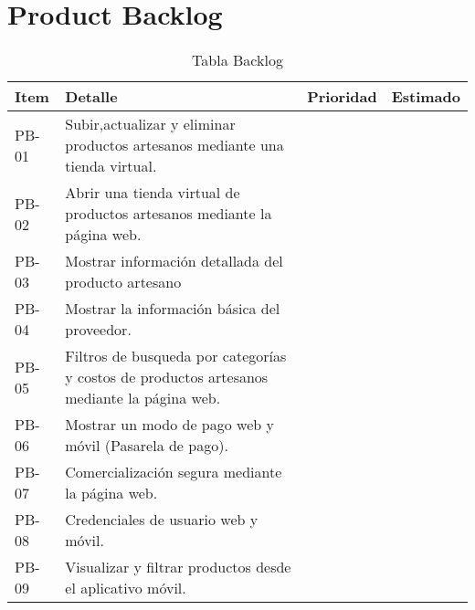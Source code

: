 \chapter{Product Backlog}


\begin{table}[htbp]
	\begin{center}
		\begin{tabular}{|p{2.5cm}|p{6.5cm}|p{2.5cm}|p{2.5cm}|}
			\hline
			Item & Detalle & Prioridad & Estimado\\
			\hline \hline
			PB-01 & Subir,actualizar y eliminar  productos artesanos mediante una tienda virtual. &  & \\ \hline
		    PB-02 & Abrir una tienda virtual de productos artesanos mediante la página web. &   & \\ \hline
			PB-03 & Mostrar información detallada del producto artesano &  & \\ \hline
			PB-04 & Mostrar la información básica del proveedor. &  & \\ \hline
			PB-05 & Filtros de busqueda por categorías y costos de productos artesanos mediante la página web. &  & \\ \hline
			PB-06 & Mostrar un modo de pago web y móvil (Pasarela de pago). &  & \\ \hline
			PB-07 & Comercialización segura mediante la página web. &  & \\ \hline
			PB-08 & Credenciales de usuario web y móvil. &  & \\ \hline
			PB-09 & Visualizar y filtrar productos desde el aplicativo móvil. &  & \\ \hline			
			
			
		\end{tabular}
		\caption{Tabla Backlog}
		\label{tabla:sencilla}
	\end{center}
\end{table}